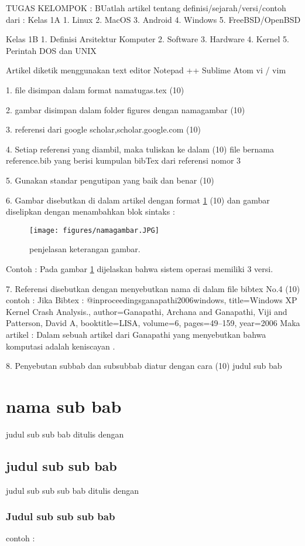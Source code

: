 




TUGAS KELOMPOK : 
BUatlah artikel tentang definisi/sejarah/versi/contoh dari :
Kelas 1A
1. Linux
2. MacOS
3. Android
4. Windows
5. FreeBSD/OpenBSD

Kelas 1B
1. Definisi Arsitektur Komputer
2. Software
3. Hardware
4. Kernel
5. Perintah DOS dan UNIX


Artikel diketik menggunakan text editor
Notepad ++
Sublime
Atom
vi / vim

1. file disimpan dalam format namatugas.tex (10)

2. gambar disimpan dalam folder figures dengan namagambar (10)

3. referensi dari google scholar,scholar.google.com (10)

4. Setiap referensi yang diambil, maka tuliskan ke dalam (10)
	file bernama reference.bib
   yang berisi kumpulan bibTex dari referensi nomor 3

5. Gunakan standar pengutipan yang baik dan benar (10)

6. Gambar disebutkan di dalam artikel dengan format \ref{namagambar} (10)
   dan gambar diselipkan dengan menambahkan blok sintaks :
	\begin{figure}[ht]
	\centerline{\texttt{[image: figures/namagambar.JPG]}}
	\caption{penjelasan keterangan gambar.}
	\label{namagambar}
	\end{figure}
	Contoh :
	Pada gambar \ref{namagambar} dijelaskan bahwa sistem operasi memiliki 3 versi.
	
7. Referensi disebutkan dengan menyebutkan nama di dalam file bibtex No.4 (10)
   contoh :
	Jika Bibtex :
	@inproceedings{ganapathi2006windows,
	  title={Windows XP Kernel Crash Analysis.},
	  author={Ganapathi, Archana and Ganapathi, Viji and Patterson, David A},
	  booktitle={LISA},
	  volume={6},
	  pages={49--159},
	  year={2006}
	}
	Maka artikel :
	Dalam sebuah artikel dari Ganapathi yang menyebutkan bahwa komputasi 
	adalah keniscayan \cite{ganapathi2006windows}.
	
	
8. Penyebutan subbab dan subsubbab diatur dengan cara (10)
	judul sub bab \section{nama sub bab}
	judul sub sub bab ditulis dengan \subsection{judul sub sub bab}
	judul sub sub sub bab ditulis dengan \subsubsection{Judul sub sub sub bab}
	contoh :
